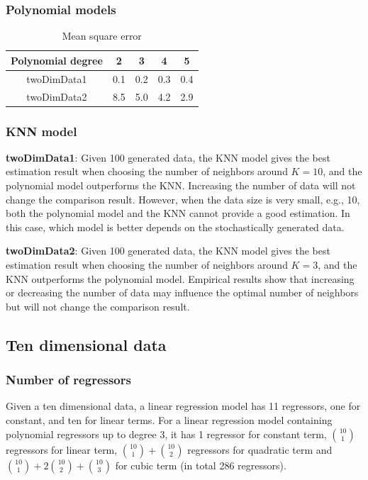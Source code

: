 \documentclass[]{article}
\begin{document}
\subsubsection{Polynomial models}
\begin{table}[H]
	\centering
	\caption{Mean square error}
	\label{tab:twodimData}
	\begin{tabular}{@{}ccccc@{}}
		\toprule
		Polynomial degree & 2   & 3   & 4   & 5   \\ \midrule
		twoDimData1       & 0.1 & 0.2 & 0.3 & 0.4 \\
		twoDimData2       & 8.5 & 5.0 & 4.2 & 2.9 \\ \bottomrule
	\end{tabular}
\end{table}

\subsubsection{KNN model}

\textbf{twoDimData1}: Given 100 generated data, the KNN model gives the best estimation result when choosing the number of neighbors around $K=10$, and the polynomial model outperforms the KNN. Increasing the number of data will not change the comparison result. However, when the data size is very small, e.g., 10, both the polynomial model and the KNN cannot provide a good estimation. In this case, which model is better depends on the stochastically generated data.

\textbf{twoDimData2}: Given 100 generated data, the KNN model gives the best estimation result when choosing the number of neighbors around $K=3$, and the KNN outperforms the polynomial model. Empirical results show that increasing or decreasing the number of data may influence the optimal number of neighbors but will not change the comparison result.

\subsection{Ten dimensional data} 

\subsubsection{Number of regressors}
Given a ten dimensional data, a linear regression model has 11 regressors, one for constant, and ten for linear terms. For a linear regression model containing polynomial regressors up to degree 3, it has 1 regressor for constant term, ${10}\choose{1}$ regressors for linear term, ${{10}\choose{1}}+{{10}\choose{2}}$ regressors for quadratic term and ${{10}\choose{1}}+2{{10}\choose{2}}+{{10}\choose{3}}$ for cubic term (in total 286 regressors). 
\end{document}
